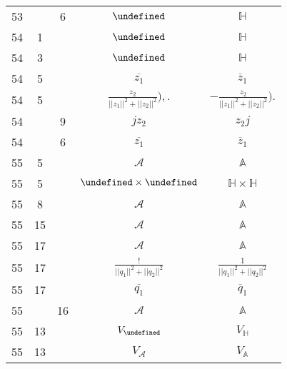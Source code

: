 \documentclass[a4paper,11pt]{article}
\newcommand{\fr}{\frac}
\newcommand{\mb}{\mathbb}
\newcommand{\mc}{\mathcal}
\newcommand{\ol}{\overline}
\newcommand{\ti}{\times}
\newcommand{\Ab}{\mb{A}}
\newcommand{\Hb}{\mb{H}}
\newcommand{\A}{\mc{A}}
\let\H\undefined
\newcommand{\H}{\mc{H}}
\begin{document}
\begin{center}
\begin{tabular}{|c|c|c|c|c|}
    53 & &  6 & $\H$ & $\Hb$ \\
    54 & 1 & & $\H$ & $\Hb$ \\
    54 & 3 & & $\H$ & $\Hb$ \\
    54 & 5 & & $\ol{ z_{ 1 } }$ & $\ol{ z }_{ 1 }$ \\
    54 & 5 & & $\fr{ z_{ 2 } }{ || z_{ 1 } ||^{ 2 }
               + || z_{ 2 } ||^{ 2 } } ),.$
           & $-\fr{ z_{ 2 } }{ || z_{ 1 } ||^{ 2 }
             + || z_{ 2 } ||^{ 2 } } ).$ \\
    54 & & 9 & $j z_{ 2 }$ & $z_{ 2 } j$ \\
    54 & & 6 & $\ol{ z_{ 1 } }$ & $\ol{ z }_{ 1 }$ \\
    55 &  5 & & $\A$ & $\Ab$ \\
    55 &  5 & & $\H \ti \H$ & $\Hb \ti \Hb$ \\
    55 &  8 & & $\A$ & $\Ab$ \\
    55 & 15 & & $\A$ & $\Ab$ \\
    55 & 17 & & $\A$ & $\Ab$ \\
    55 & 17 & & $\fr{ ! }{ || q_{ 1 } ||^{ 2 } + || q_{ 2 } ||^{ 2 } }$
           & $\fr{ 1 }{ || q_{ 1 } ||^{ 2 } + || q_{ 2 } ||^{ 2 } }$ \\
    55 & 17 & & $\ol{ q_{ 1 } }$ & $\ol{ q }_{ 1 }$ \\
    55 & & 16 & $\A$ & $\Ab$ \\
    55 & 13 & & $V_{ \H }$ & $V_{ \Hb }$ \\
    55 & 13 & & $V_{ \A }$ & $V_{ \Ab }$ \\ \hline
  \end{tabular}


\end{center}
\end{document}

